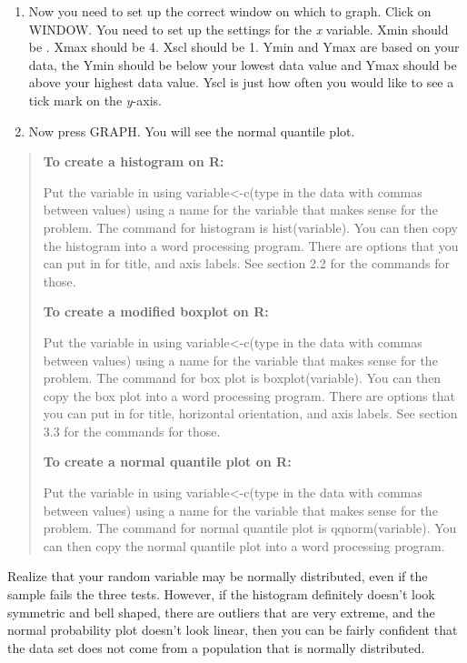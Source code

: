 \documentclass[]{book}
\begin{document}
\begin{enumerate}
\def\labelenumi{\arabic{enumi}.}
\setcounter{enumi}{5}
\item
  Now you need to set up the correct window on which to graph. Click
  on WINDOW. You need to set up the settings for the \emph{x} variable.
  Xmin should be . Xmax should be 4. Xscl should be 1. Ymin and Ymax
  are based on your data, the Ymin should be below your lowest data
  value and Ymax should be above your highest data value. Yscl is just
  how often you would like to see a tick mark on the \emph{y}-axis.
\item
  Now press GRAPH. You will see the normal quantile plot.
\end{enumerate}

\begin{quote}
\textbf{To create a histogram on R:}

Put the variable in using variable\textless{}-c(type in the data with commas
between values) using a name for the variable that makes sense for the
problem. The command for histogram is hist(variable). You can then
copy the histogram into a word processing program. There are options
that you can put in for title, and axis labels. See section 2.2 for
the commands for those.

\textbf{To create a modified boxplot on R:}

Put the variable in using variable\textless{}-c(type in the data with commas
between values) using a name for the variable that makes sense for the
problem. The command for box plot is boxplot(variable). You can then
copy the box plot into a word processing program. There are options
that you can put in for title, horizontal orientation, and axis
labels. See section 3.3 for the commands for those.

\textbf{To create a normal quantile plot on R:}

Put the variable in using variable\textless{}-c(type in the data with commas
between values) using a name for the variable that makes sense for the
problem. The command for normal quantile plot is qqnorm(variable). You
can then copy the normal quantile plot into a word processing program.
\end{quote}

Realize that your random variable may be normally distributed, even if
the sample fails the three tests. However, if the histogram definitely
doesn't look symmetric and bell shaped, there are outliers that are
very extreme, and the normal probability plot doesn't look linear, then
you can be fairly confident that the data set does not come from a
population that is normally distributed.
\end{document}
